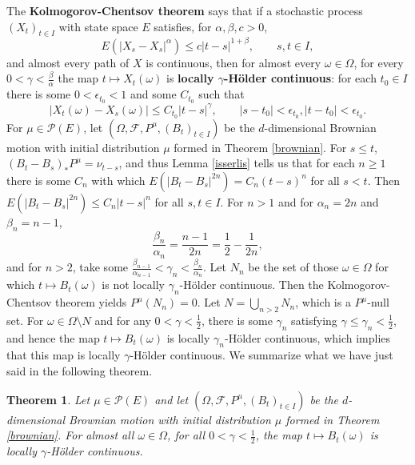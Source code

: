 \documentclass{article}
\newtheorem{theorem}{Theorem}
\theoremstyle{definition}
\begin{document}
The \textbf{Kolmogorov-Chentsov theorem} says that if a stochastic process $(X_t)_{t \in I}$ with state space
$E$ satisfies, for 
$\alpha,\beta,c>0$,
\[
E(|X_s-X_s|^\alpha) \leq c |t-s|^{1+\beta}, \qquad s,t \in I,
\]
and almost every path of $X$ is continuous, then for almost every $\omega \in \Omega$, for every
$0<\gamma<\frac{\beta}{\alpha}$ the map $t \mapsto X_t(\omega)$ is \textbf{locally
$\gamma$-H\"older continuous}: for each $t_0 \in I$ there is some $0<\epsilon_{t_0}<1$ and
some $C_{t_0}$ such that
\[
|X_t(\omega)-X_s(\omega)| \leq C_{t_0}|t-s|^\gamma, \qquad |s-t_0|<\epsilon_{t_0}, |t-t_0|<\epsilon_{t_0}.
\]
For $\mu \in \mathscr{P}(E)$,
let $(\Omega,\mathscr{F},P^\mu,(B_t)_{t \in I})$
be the $d$-dimensional Brownian motion with initial distribution $\mu$ formed in Theorem \ref{brownian}.
For $s \leq  t$, $(B_t-B_s)_*P^\mu = \nu_{t-s}$, and thus
Lemma \ref{isserlis}  tells us that for each $n \geq 1$ there is some $C_n$ with which
 $E(|B_t-B_s|^{2n}) = C_n (t-s)^n$ for all $s<t$. Then $E(|B_t-B_s|^{2n}) \leq C_n|t-s|^n$ for all $s,t \in I$.
 For $n >1$ and for $\alpha_n=2n$ and $\beta_n=n-1$, 
 \[
 \frac{\beta_n}{\alpha_n} = \frac{n-1}{2n} = \frac{1}{2} - \frac{1}{2n},
 \]
 and for $n>2$, take some $\frac{\beta_{n-1}}{\alpha_{n-1}}<\gamma_n<\frac{\beta_n}{\alpha_n}$.  
Let $N_n$ be the set of those $\omega \in \Omega$ for which
$t \mapsto B_t(\omega)$ is not locally $\gamma_n$-H\"older continuous. Then the Kolmogorov-Chentsov theorem yields
$P^\mu(N_n)=0$.
Let $N = \bigcup_{n>2} N_n$, which is a $P^\mu$-null set. For $\omega \in \Omega \setminus N$ and for any 
$0<\gamma<\frac{1}{2}$, 
there is some $\gamma_n$ satisfying $\gamma \leq \gamma_n<\frac{1}{2}$, and hence 
the map $t \mapsto B_t(\omega)$ is 
locally $\gamma_n$-H\"older continuous, which implies that this map is locally $\gamma$-H\"older continuous.
We summarize what we have just said in the following theorem. 

\begin{theorem}
Let $\mu \in \mathscr{P}(E)$ and let
$(\Omega,\mathscr{F},P^\mu,(B_t)_{t \in I})$ be the $d$-dimensional Brownian motion with initial distribution
$\mu$ 
formed in Theorem \ref{brownian}. For almost all $\omega \in \Omega$, for all $0<\gamma<\frac{1}{2}$, the map
$t \mapsto B_t(\omega)$  is locally $\gamma$-H\"older continuous.
\end{theorem}
\end{document}
